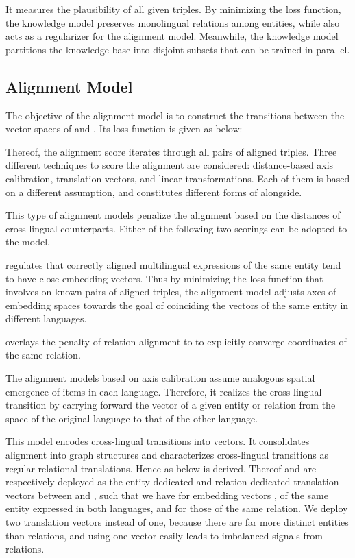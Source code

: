 \documentclass{article}
\def\inv{\vspace{-0.1cm}}
\begin{document}
It measures the plausibility of all given triples. By minimizing the loss function, the knowledge model preserves monolingual relations among entities, while also acts as a regularizer for the alignment model. Meanwhile, the knowledge model partitions the knowledge base into disjoint subsets that can be trained in parallel.



\inv
\subsection{Alignment Model}

The objective of the alignment model is to construct the transitions between the vector spaces of  and . Its loss function is given as below:

Thereof, the alignment score  iterates through all pairs of aligned triples. Three different techniques to score the alignment are considered: distance-based axis calibration, translation vectors, and linear transformations. Each of them is based on a different assumption, and constitutes different forms of  alongside.

This type of \mbox{alignment} models penalize the alignment based on the distances of cross-lingual counterparts. Either of the following two scorings can be adopted to the model.

 regulates that correctly aligned multilingual \mbox{expressions} of the same entity tend to have close embedding vectors. Thus by minimizing the loss function that involves  on known pairs of aligned triples, the alignment model adjusts axes of embedding spaces towards the goal of coinciding the vectors of the same entity in different languages.

 overlays the penalty of relation alignment to  to explicitly converge coordinates of the same relation. \par

The alignment models based on axis calibration assume analogous spatial emergence of items in each language. Therefore, it realizes the cross-lingual transition by carrying forward the vector of a given entity or relation from the space of the original language to that of the other language.

This model encodes cross-lingual transitions into vectors. It consolidates alignment into graph structures and characterizes cross-lingual transitions as regular relational translations. Hence  as below is derived. 
Thereof  and  are respectively deployed as the entity-dedicated and relation-dedicated translation vectors between  and , such that we have  for embedding vectors ,  of the same entity  expressed in both languages, and  for those of the same relation. We deploy two translation vectors instead of one, because there are far more distinct entities than relations, and using one vector easily leads to imbalanced signals from relations. \par
\end{document}
